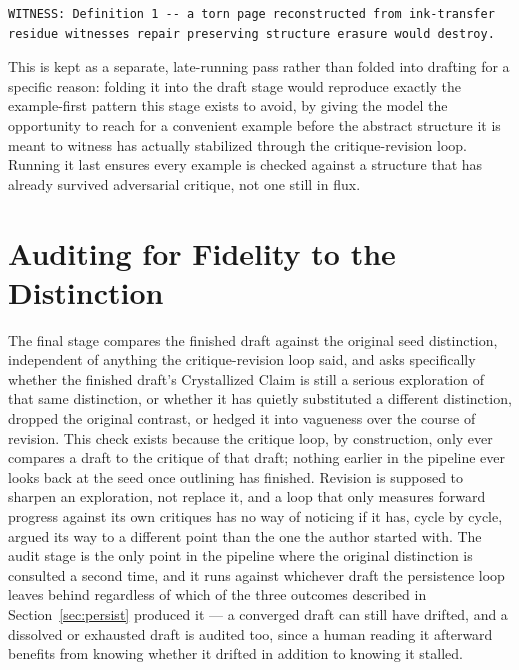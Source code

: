 \documentclass[11pt]{article}
\theoremstyle{definition}
\begin{document}
\begin{lstlisting}[caption={Witness stage output format}]
WITNESS: Definition 1 -- a torn page reconstructed from ink-transfer
residue witnesses repair preserving structure erasure would destroy.
\end{lstlisting}

This is kept as a separate, late-running pass rather than folded into
drafting for a specific reason: folding it into the draft stage would
reproduce exactly the example-first pattern this stage exists to avoid,
by giving the model the opportunity to reach for a convenient example
before the abstract structure it is meant to witness has actually
stabilized through the critique-revision loop. Running it last ensures
every example is checked against a structure that has already survived
adversarial critique, not one still in flux.

\section{Auditing for Fidelity to the Distinction}
\label{sec:audit}

The final stage compares the finished draft against the original seed
distinction, independent of anything the critique-revision loop said,
and asks specifically whether the finished draft's Crystallized Claim
is still a serious exploration of that same distinction, or whether it
has quietly substituted a different distinction, dropped the original
contrast, or hedged it into vagueness over the course of revision. This
check exists because the critique loop, by construction, only ever
compares a draft to the critique of that draft; nothing earlier in the
pipeline ever looks back at the seed once outlining has finished.
Revision is supposed to sharpen an exploration, not replace it, and a
loop that only measures forward progress against its own critiques has
no way of noticing if it has, cycle by cycle, argued its way to a
different point than the one the author started with. The audit stage
is the only point in the pipeline where the original distinction is
consulted a second time, and it runs against whichever draft the
persistence loop leaves behind regardless of which of the three
outcomes described in Section~\ref{sec:persist} produced it --- a
converged draft can still have drifted, and a dissolved or exhausted
draft is audited too, since a human reading it afterward benefits from
knowing whether it drifted in addition to knowing it stalled.
\end{document}
